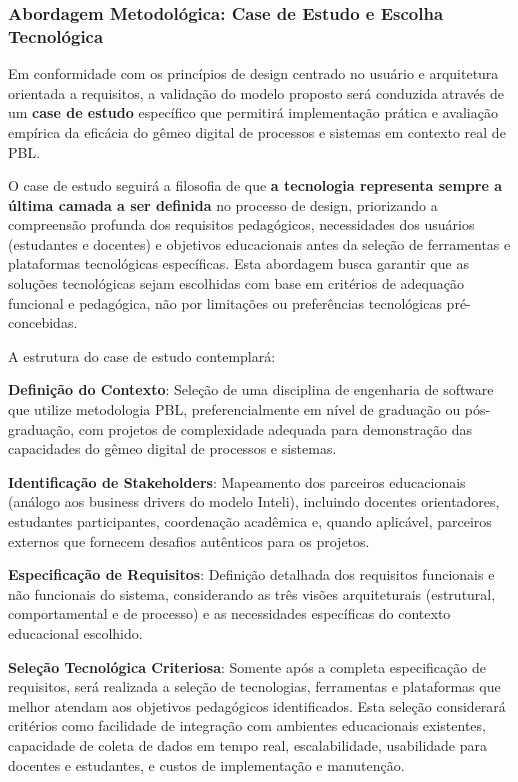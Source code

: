 \documentclass[12pt, a4paper, oneside, brazilian]{abntex2}
\begin{document}
\subsubsection{Abordagem Metodológica: Case de Estudo e Escolha Tecnológica}

Em conformidade com os princípios de design centrado no usuário e arquitetura orientada a requisitos, a validação do modelo proposto será conduzida através de um \textbf{case de estudo} específico que permitirá implementação prática e avaliação empírica da eficácia do gêmeo digital de processos e sistemas em contexto real de PBL.

O case de estudo seguirá a filosofia de que \textbf{a tecnologia representa sempre a última camada a ser definida} no processo de design, priorizando a compreensão profunda dos requisitos pedagógicos, necessidades dos usuários (estudantes e docentes) e objetivos educacionais antes da seleção de ferramentas e plataformas tecnológicas específicas. Esta abordagem busca garantir que as soluções tecnológicas sejam escolhidas com base em critérios de adequação funcional e pedagógica, não por limitações ou preferências tecnológicas pré-concebidas.

A estrutura do case de estudo contemplará:

\textbf{Definição do Contexto}: Seleção de uma disciplina de engenharia de software que utilize metodologia PBL, preferencialmente em nível de graduação ou pós-graduação, com projetos de complexidade adequada para demonstração das capacidades do gêmeo digital de processos e sistemas.

\textbf{Identificação de Stakeholders}: Mapeamento dos parceiros educacionais (análogo aos business drivers do modelo Inteli), incluindo docentes orientadores, estudantes participantes, coordenação acadêmica e, quando aplicável, parceiros externos que fornecem desafios autênticos para os projetos.

\textbf{Especificação de Requisitos}: Definição detalhada dos requisitos funcionais e não funcionais do sistema, considerando as três visões arquiteturais (estrutural, comportamental e de processo) e as necessidades específicas do contexto educacional escolhido.

\textbf{Seleção Tecnológica Criteriosa}: Somente após a completa especificação de requisitos, será realizada a seleção de tecnologias, ferramentas e plataformas que melhor atendam aos objetivos pedagógicos identificados. Esta seleção considerará critérios como facilidade de integração com ambientes educacionais existentes, capacidade de coleta de dados em tempo real, escalabilidade, usabilidade para docentes e estudantes, e custos de implementação e manutenção.
\end{document}
